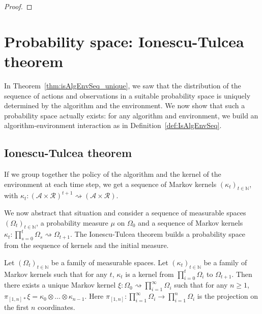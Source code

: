 \begin{proof}\leanok

\end{proof}



\section{Probability space: Ionescu-Tulcea theorem}

In Theorem~\ref{thm:isAlgEnvSeq_unique}, we saw that the distribution of the sequence of actions and observations in a suitable probability space is uniquely determined by the algorithm and the environment.
We now show that such a probability space actually exists: for any algorithm and environment, we build an algorithm-environment interaction as in Definition~\ref{def:IsAlgEnvSeq}.



\subsection{Ionescu-Tulcea theorem}

If we group together the policy of the algorithm and the kernel of the environment at each time step, we get a sequence of Markov kernels $(\kappa_t)_{t \in \mathbb{N}}$, with $\kappa_t : (\mathcal{A} \times \mathcal{R})^{t+1}  \rightsquigarrow (\mathcal{A} \times \mathcal{R})$.


We now abstract that situation and consider a sequence of measurable spaces $(\Omega_t)_{t \in \mathbb{N}}$, a probability measure $\mu$ on $\Omega_0$ and a sequence of Markov kernels $\kappa_t : \prod_{s=0}^t \Omega_s \rightsquigarrow \Omega_{t+1}$.
The Ionescu-Tulcea theorem builds a probability space from the sequence of kernels and the initial measure.


\begin{theorem}\label{thm:ionescu-tulcea}
  \mathlibok
Let $(\Omega_t)_{t \in \mathbb{N}}$ be a family of measurable spaces. Let $(\kappa_t)_{t \in \mathbb{N}}$ be a family of Markov kernels such that for any $t$, $\kappa_t$ is a kernel from $\prod_{i=0}^t \Omega_{i}$ to $\Omega_{t+1}$.
Then there exists a unique Markov kernel $\xi : \Omega_0 \rightsquigarrow \prod_{i = 1}^{\infty} \Omega_{i}$ such that for any $n \ge 1$,
$\pi_{[1,n]*} \xi = \kappa_0 \otimes \ldots \otimes \kappa_{n-1}$.
Here $\pi_{[1,n]} : \prod_{i=1}^{\infty} \Omega_i \to \prod_{i=1}^n \Omega_i$ is the projection on the first $n$ coordinates.
\end{theorem}

